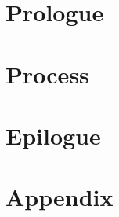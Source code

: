 

\part{Prologue}



\cleardoublepage
\part{Process} %






\part{Epilogue}


\part{Appendix} %

\appendix

